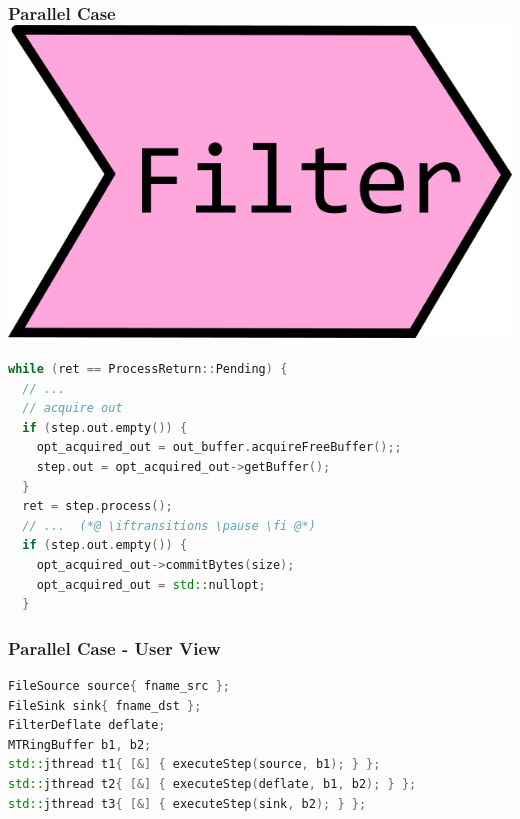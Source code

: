 \documentclass[aspectratio=169]{beamer}
\newif\iftransitions
\begin{document}
\begin{frame}[fragile]
  \frametitle{Parallel Case \hspace{310pt} \includegraphics[height=.1\textheight]{pipelinesgfx/filter.png}}

  \begin{lstlisting}[language={C++}]
while (ret == ProcessReturn::Pending) {
  // ...
  // acquire out
  if (step.out.empty()) {
    opt_acquired_out = out_buffer.acquireFreeBuffer();;
    step.out = opt_acquired_out->getBuffer();
  }
  ret = step.process();
  // ...  (*@ \iftransitions \pause \fi @*)
  if (step.out.empty()) {
    opt_acquired_out->commitBytes(size);
    opt_acquired_out = std::nullopt;
  }
  \end{lstlisting}
\end{frame}

\begin{frame}[fragile]

\frametitle{Parallel Case - User View}

\begin{lstlisting}[language={C++}]
FileSource source{ fname_src };
FileSink sink{ fname_dst };
FilterDeflate deflate;
MTRingBuffer b1, b2;
std::jthread t1{ [&] { executeStep(source, b1); } };
std::jthread t2{ [&] { executeStep(deflate, b1, b2); } };
std::jthread t3{ [&] { executeStep(sink, b2); } };
\end{lstlisting}

\end{frame}
\end{document}
